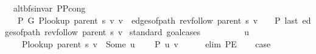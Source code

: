 \begin{isabellebody}
{\isafoldproof}%
%
\isadelimproof
\isanewline
%
\endisadelimproof
\isanewline
{}\isamarkupfalse%
\ {\isacharparenleft}{\kern0pt}\ alt{\isacharunderscore}{\kern0pt}bfs{\isacharunderscore}{\kern0pt}invar{\isacharparenright}{\kern0pt}\ P{\isacharprime}{\kern0pt}{\isacharunderscore}{\kern0pt}P{\isacharprime}{\kern0pt}{\isacharprime}{\kern0pt}{\isacharunderscore}{\kern0pt}cong{\isacharcolon}{\kern0pt}\isanewline
\ \ \ {\isachardoublequoteopen}P{\isacharprime}{\kern0pt}\ G{}\ {\isacharparenleft}{\kern0pt}P{\isacharunderscore}{\kern0pt}lookup\ {\isacharparenleft}{\kern0pt}parent\ s{\isacharparenright}{\kern0pt}\ v{\isacharparenright}{\kern0pt}\ v\ {\isasymlongleftrightarrow}\ edges{\isacharunderscore}{\kern0pt}of{\isacharunderscore}{\kern0pt}path\ {\isacharparenleft}{\kern0pt}rev{\isacharunderscore}{\kern0pt}follow\ {\isacharparenleft}{\kern0pt}parent\ s{\isacharparenright}{\kern0pt}\ v{\isacharparenright}{\kern0pt}\ {\isasymnoteq}\ {\isacharbrackleft}{\kern0pt}{\isacharbrackright}{\kern0pt}\ {\isasymand}\ P{\isacharprime}{\kern0pt}{\isacharprime}{\kern0pt}\ {\isacharparenleft}{\kern0pt}last\ {\isacharparenleft}{\kern0pt}edges{\isacharunderscore}{\kern0pt}of{\isacharunderscore}{\kern0pt}path\ {\isacharparenleft}{\kern0pt}rev{\isacharunderscore}{\kern0pt}follow\ {\isacharparenleft}{\kern0pt}parent\ s{\isacharparenright}{\kern0pt}\ v{\isacharparenright}{\kern0pt}{\isacharparenright}{\kern0pt}{\isacharparenright}{\kern0pt}{\isachardoublequoteclose}\isanewline
%
\isadelimproof
%
\endisadelimproof
%
\isatagproof
{}\isamarkupfalse%
\ {\isacharparenleft}{\kern0pt}standard{\isacharcomma}{\kern0pt}\ goal{\isacharunderscore}{\kern0pt}cases{\isacharparenright}{\kern0pt}\isanewline
\ \ \isamarkupfalse%
\ {}\isanewline
\ \ \isamarkupfalse%
\ \isamarkupfalse%
\ u\ \isanewline
\ \ \ \ {\isachardoublequoteopen}P{\isacharunderscore}{\kern0pt}lookup\ {\isacharparenleft}{\kern0pt}parent\ s{\isacharparenright}{\kern0pt}\ v\ {\isacharequal}{\kern0pt}\ Some\ u{\isachardoublequoteclose}\isanewline
\ \ \ \ {\isachardoublequoteopen}P{\isacharprime}{\kern0pt}{\isacharprime}{\kern0pt}\ {\isacharbraceleft}{\kern0pt}u{\isacharcomma}{\kern0pt}\ v{\isacharbraceright}{\kern0pt}{\isachardoublequoteclose}\isanewline
\ \ \ \ \isamarkupfalse%
\ {\isacharparenleft}{\kern0pt}elim\ P{\isacharprime}{\kern0pt}E{\isacharparenright}{\kern0pt}\isanewline
\ \ \isamarkupfalse%
\ {\isacharquery}{\kern0pt}case\isanewline

\end{isabellebody}
